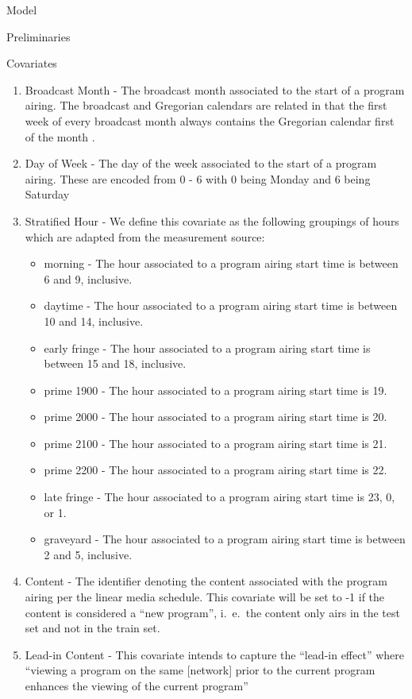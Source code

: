 \begin{chapter}{Model}
\begin{section}{Preliminaries}
\begin{subsection}{Covariates}
    \begin{enumerate}
    \item Broadcast Month - The broadcast month associated to the start of a program airing.
      The broadcast and Gregorian calendars are related in that the first week of every broadcast month always contains the Gregorian calendar first of the month \cite{calendar}.
    \item Day of Week - The day of the week associated to the start of a program airing.
      These are encoded from 0 - 6 with 0 being Monday and 6 being Saturday
    \item Stratified Hour - We define this covariate as the following groupings of hours which are adapted from the measurement source:
      \begin{itemize}
        \item morning - The hour associated to a program airing start time is between 6 and 9, inclusive.
        \item daytime - The hour associated to a program airing start time is between 10 and 14, inclusive.
        \item early fringe - The hour associated to a program airing start time is between 15 and 18, inclusive.
        \item prime 1900 - The hour associated to a program airing start time is 19.
        \item prime 2000 - The hour associated to a program airing start time is 20.
        \item prime 2100 - The hour associated to a program airing start time is 21.
        \item prime 2200 - The hour associated to a program airing start time is 22.
        \item late fringe - The hour associated to a program airing start time is 23, 0, or 1.
        \item graveyard - The hour associated to a program airing start time is between 2 and 5, inclusive.
      \end{itemize}
    \item Content - The identifier denoting the content associated with the program airing per the linear media schedule.
      This covariate will be set to -1 if the content is considered a ``new program'', i.\ e.\ the content only airs in
      the test set and not in the train set.
    \item Lead-in Content -
      This covariate intends to capture the ``lead-in effect'' where
      ``viewing a program on the same [network] prior to the current program enhances the viewing of the current program''

\end{enumerate}
\end{subsection}
\end{section}
\end{chapter}
